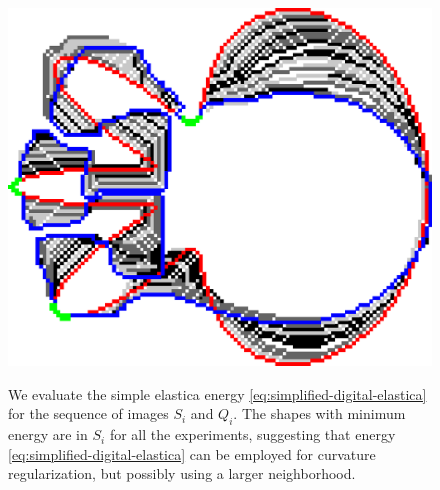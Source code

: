 \begin{figure}[h!]
\begin{minipage}[c]{0.32\textwidth}
{	\includegraphics[scale=0.19]{figures/chapter5/sqc/fixed-points/flower-2/summary.pdf}}\\
\end{minipage}
\caption{We evaluate the simple elastica energy \eqref{eq:simplified-digital-elastica} for the sequence of images $S_i$ and $Q_i$. The shapes with minimum energy are in $S_i$ for all the experiments, suggesting that energy \eqref{eq:simplified-digital-elastica} can be employed for curvature regularization, but possibly using a larger neighborhood. }
\label{fig:aaa}
\end{figure}

